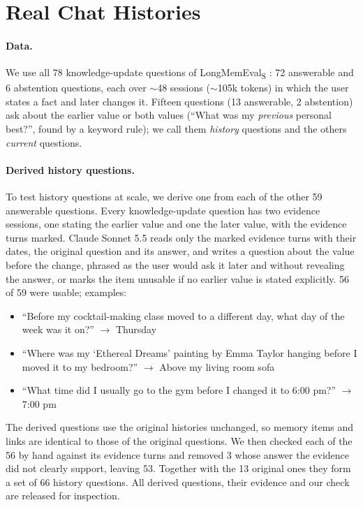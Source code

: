 \documentclass[11pt]{article}
\begin{document}
\section{Real Chat Histories}
\label{sec:lme}

\paragraph{Data.} We use all 78 knowledge-update questions of LongMemEval\textsubscript{S}
\citep{wu2025longmemeval}: 72 answerable and 6 abstention questions, each over ${\sim}$48 sessions
(${\sim}$105k tokens) in which the user states a fact and later changes it. Fifteen questions
(13 answerable, 2 abstention) ask about the earlier value or both values (``What was my \emph{previous} personal best?'', found by a keyword rule);
we call them \emph{history} questions and the others \emph{current} questions.

\paragraph{Derived history questions.} To test history questions at scale, we derive one from each of
the other 59 answerable questions. Every knowledge-update question has two evidence sessions, one
stating the earlier value and one the later value, with the evidence turns marked. Claude Sonnet 5.5
reads only the marked evidence turns with their dates, the original question and its answer, and writes a question about
the value before the change, phrased as the user would ask it later and without revealing the answer,
or marks the item unusable if no earlier value is stated explicitly. 56 of 59 were usable; examples:
\begin{itemize}
\setlength\itemsep{0pt}
\item ``Before my cocktail-making class moved to a different day, what day of the week was it on?'' $\rightarrow$ Thursday
\item ``Where was my `Ethereal Dreams' painting by Emma Taylor hanging before I moved it to my bedroom?'' $\rightarrow$ Above my living room sofa
\item ``What time did I usually go to the gym before I changed it to 6:00 pm?'' $\rightarrow$ 7:00 pm
\end{itemize}
The derived questions use the original histories unchanged, so memory items and links are identical
to those of the original questions. We then checked each of the 56 by hand against its evidence turns and removed 3 whose answer the
evidence did not clearly support, leaving 53. Together with the 13 original ones they form a set of
66 history questions. All derived questions, their evidence and our check are released for inspection.
\end{document}
